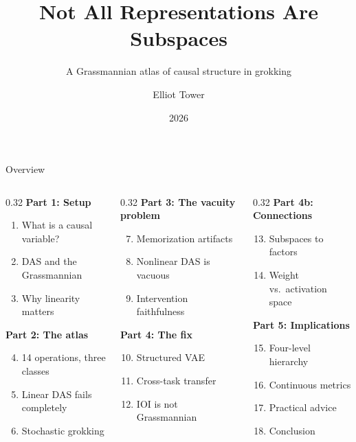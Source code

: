 \documentclass[aspectratio=169,11pt]{beamer}
\title{Not All Representations Are Subspaces}
\subtitle{A Grassmannian atlas of causal structure in grokking}
\author{Elliot Tower}
\date{2026}
\institute{}
\begin{document}
\maketitle

\begin{frame}{Overview}
\begin{columns}[T]
\begin{column}{0.32\textwidth}
\textbf{Part 1: Setup}
\begin{enumerate}
  \item What is a causal variable?
  \item DAS and the Grassmannian
  \item Why linearity matters
\end{enumerate}
\vspace{0.5em}
\textbf{Part 2: The atlas}
\begin{enumerate}
  \setcounter{enumi}{3}
  \item 14 operations, three classes
  \item Linear DAS fails completely
  \item Stochastic grokking
\end{enumerate}
\end{column}
\begin{column}{0.32\textwidth}
\textbf{Part 3: The vacuity problem}
\begin{enumerate}
  \setcounter{enumi}{6}
  \item Memorization artifacts
  \item Nonlinear DAS is vacuous
  \item Intervention faithfulness
\end{enumerate}
\vspace{0.5em}
\textbf{Part 4: The fix}
\begin{enumerate}
  \setcounter{enumi}{9}
  \item Structured VAE
  \item Cross-task transfer
  \item IOI is not Grassmannian
\end{enumerate}
\end{column}
\begin{column}{0.32\textwidth}
\textbf{Part 4b: Connections}
\begin{enumerate}
  \setcounter{enumi}{12}
  \item Subspaces to factors
  \item Weight vs.\ activation space
\end{enumerate}
\vfill
\textbf{Part 5: Implications}
\begin{enumerate}
  \setcounter{enumi}{14}
  \item Four-level hierarchy
  \item Continuous metrics
  \item Practical advice
  \item Conclusion
\end{enumerate}
\end{column}
\end{columns}
\end{frame}
\end{document}
